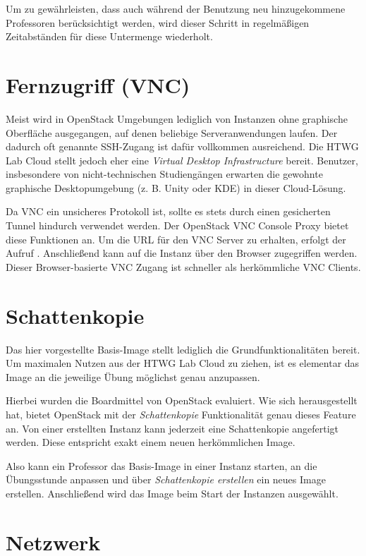 Um zu gewährleisten, dass auch während der Benutzung neu hinzugekommene Professoren berücksichtigt werden, wird dieser Schritt in regelmäßigen Zeitabständen für diese Untermenge wiederholt.

\section{Fernzugriff (VNC)}\label{vnc}

Meist wird in OpenStack Umgebungen lediglich von Instanzen ohne graphische Oberfläche ausgegangen, auf denen beliebige Serveranwendungen laufen. 
Der dadurch oft genannte SSH-Zugang ist dafür vollkommen ausreichend.
Die HTWG Lab Cloud stellt jedoch eher eine \emph{Virtual Desktop Infrastructure} bereit.
Benutzer, insbesondere von nicht-technischen Studiengängen erwarten die gewohnte graphische Desktopumgebung (z. B. Unity oder KDE) in dieser Cloud-Lösung.

Da VNC ein unsicheres Protokoll ist, sollte es stets durch einen gesicherten Tunnel hindurch verwendet werden.
Der OpenStack VNC Console Proxy bietet diese Funktionen an.
Um die URL für den VNC Server zu erhalten, erfolgt der Aufruf .
Anschließend kann auf die Instanz über den Browser zugegriffen werden.
Dieser Browser-basierte VNC Zugang ist schneller als herkömmliche VNC Clients.

\section{Schattenkopie}

Das hier vorgestellte Basis-Image stellt lediglich die Grundfunktionalitäten bereit. 
Um maximalen Nutzen aus der HTWG Lab Cloud zu ziehen, ist es elementar das Image an die jeweilige Übung möglichst genau anzupassen.

Hierbei wurden die Boardmittel von OpenStack evaluiert.
Wie sich herausgestellt hat, bietet OpenStack mit der \emph{Schattenkopie} Funktionalität genau dieses Feature an.
Von einer erstellten Instanz kann jederzeit eine Schattenkopie angefertigt werden.
Diese entspricht exakt einem neuen herkömmlichen Image.

Also kann ein Professor das Basis-Image in einer Instanz starten, an die Übungsstunde anpassen und über \emph{Schattenkopie erstellen} ein neues Image erstellen.
Anschließend wird das Image beim Start der Instanzen ausgewählt.

\section{Netzwerk}

